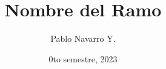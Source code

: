 \documentclass{apuntes}
\title{Nombre del Ramo}
\author{Pablo Navarro Y.}
\date{0to semestre, 2023}
\begin{document}
\renewcommand{\onlyinsubfile}[1]{}
\renewcommand{\notinsubfile}[1]{#1}
\maketitle
\end{document}
